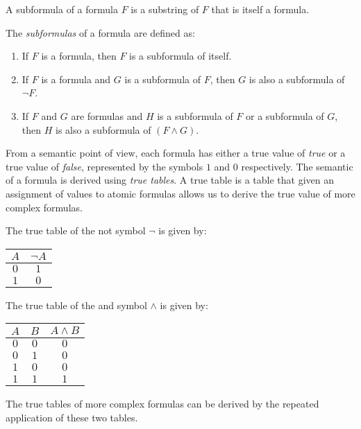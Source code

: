 A subformula of a formula $F$ is a substring of $F$ that is itself a formula.

\begin{definition}
The \emph{subformulas} of a formula are defined as:
\begin{enumerate}[label=(\roman*)]
\item If $F$ is a formula, then $F$ is a subformula of itself. 
\item If $F$ is a formula and $G$ is a subformula of $F$, then $G$ is also a subformula of $\lnot F$. 
\item If $F$ and $G$ are formulas and $H$ is a subformula of $F$ or a subformula of $G$, then $H$ is also a subformula of $(F \land G)$.
\end{enumerate}
\end{definition}

From a semantic point of view, each formula has either a true value of \emph{true} or a true value of \emph{false}, represented by the symbols $1$ and $0$ respectively. The semantic of a formula is derived using \emph{true tables}. A true table is a table that given an assignment of values to atomic formulas allows us to derive the true value of more complex formulas.

The true table of the not symbol $\lnot$ is given by:

\begin{center}
\begin{tabular}{ c | c }
 $A$ & $\lnot A$ \\
 \hline
 $0$ & $1$  \\  
 $1$ & $0$    
\end{tabular}
\end{center}

The true table of the and symbol $\land$ is given by:

\begin{center}
\begin{tabular}{ c | c | c }
 $A$ & $B$ & $A \land B$ \\
 \hline
 $0$ & $0$ & $0$ \\
 $0$ & $1$ & $0$ \\
 $1$ & $0$ & $0$ \\
 $1$ & $1$ & $1$   
\end{tabular}
\end{center}

The true tables of more complex formulas can be derived by the repeated application of these two tables.

